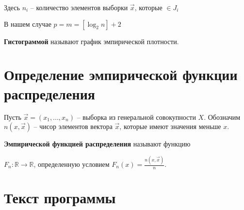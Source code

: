 \documentclass[a4paper,oneside,12pt]{extreport}
\theoremstyle{indented}
\begin{document}
    Здесь $n_i$ -- количество элементов выборки $\vec x$, которые
    $\in J_i$
    
    \hfill
    
    В нашем случае $p=m=[\log_2n] +2$
    
    \hfill

\textbf{Гистограммой} называют график эмпирической плотности. 

\section{Определение эмпирической функции распределения}

\hfill 

Пусть $\vec x = (x_1, ..., x_n)$ -- выборка из генеральной совокупности $X$. Обозначим $n(x, \vec x)$ -- чисор элементов вектора $\vec x$, которые имеют значения меньше $x$.

\hfill

\textbf{Эмпирической функцией распределения} называют функцию 

$F_n : \mathbb{R} \to \mathbb{R}$, определенную условием $F_n(x) = \frac{n(x, \vec x)}{n}$. 

\section{Текст программы}
\end{document}
